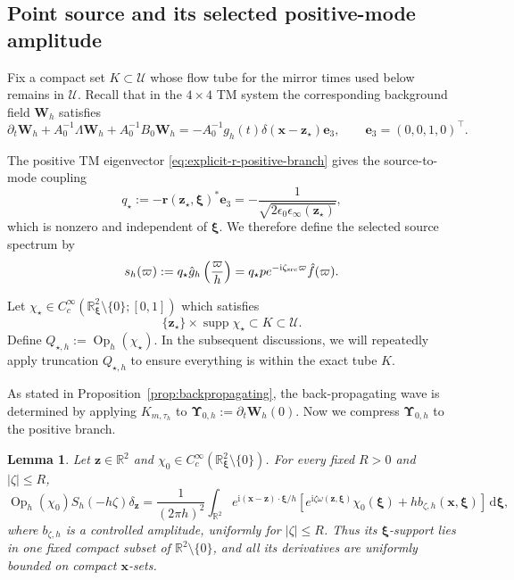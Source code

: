 \documentclass[11pt,reqno]{amsart}
\newtheorem{lemma}{Lemma}[section]
\newcommand{\ii}{\mathrm{i}}
\newcommand{\dd}{\,\mathrm{d}}
\newcommand{\Op}{\operatorname{Op}}
\newcommand{\supp}{\operatorname{supp}}
\numberwithin{equation}{section}
\begin{document}
\subsection{Point source and its selected positive-mode amplitude}

Fix a compact set $K\subset\mathcal U$ whose flow tube for the mirror times used below remains in $\mathcal U$. Recall that in the $4\times4$ TM system the corresponding background field $\bm{W}_h$ satisfies
\begin{equation*}
    \partial_t\bm{W}_h+A_0^{-1}\Lambda\bm{W}_h+A_0^{-1}B_0\bm{W}_h = -A_0^{-1}g_h(t)\delta(\bm{x}-\bm{z}_\star)\bm{e}_3, \qquad \bm{e}_3=(0,0,1,0)^\top.
\end{equation*}

The positive TM eigenvector \eqref{eq:explicit-r-positive-branch} gives the source-to-mode coupling
$$
    q_\star:=-\bm{r}(\bm{z}_\star,\bm{\xi})^*\bm{e}_3=-\frac{1}{\sqrt{2\epsilon_0\epsilon_\infty(\bm{z}_\star)}},
$$
which is nonzero and independent of $\bm{\xi}$. We therefore define the selected source spectrum by
\begin{equation}\label{eq:source-spectrum}
    s_h(\varpi):= q_\star\hat{g}_h\left(\frac{\varpi}{h}\right) = q_\star pe^{-\ii \zeta_{\rm src}\varpi}\hat{f}(\varpi).
\end{equation}

Let $\chi_\star\in C_c^\infty(\mathbb R_{\bm{\xi}}^2\setminus\{0\};[0,1])$ which satisfies
\begin{equation}\label{eq:source-cutoff}
    \{\bm{z}_\star\}\times\supp\chi_\star\subset K\subset\mathcal U.
\end{equation}
Define $Q_{\star,h}:=\Op_h(\chi_\star)$. In the subsequent discussions, we will repeatedly apply truncation $Q_{\star,h}$ to ensure everything is within the exact tube $K$. 

As stated in Proposition~\ref{prop:backpropagating}, the back-propagating wave is determined by applying $K_{m,\tau_h}$ to $\bm{\Upsilon}_{0,h}:=\partial_t\bm{W}_h(0)$. Now we compress $\bm{\Upsilon}_{0,h}$ to the positive branch. 

\begin{lemma}\label{lem:short-time-point-parametrix}
Let $\bm z\in\mathbb R^2$ and $\chi_0\in C_c^\infty(\mathbb R_{\bm\xi}^2\setminus\{0\})$. For every fixed $R>0$ and $|\zeta|\le R$,
\begin{equation}\label{eq:short-time-point-parametrix}
 \Op_h(\chi_0)S_h(-h\zeta)\delta_{\bm z}
 =\frac1{(2\pi h)^2}\int_{\mathbb R^2}e^{\ii(\bm x-\bm z)\cdot\bm\xi/h}
 \left[e^{\ii\zeta\omega(\bm z,\bm\xi)}\chi_0(\bm\xi)
 +h b_{\zeta,h}(\bm x,\bm\xi)\right]\dd\bm\xi,
\end{equation}
where $b_{\zeta,h}$ is a controlled amplitude, uniformly for $|\zeta|\le R$. Thus its $\bm\xi$-support lies in one fixed compact subset of $\mathbb R^2\setminus\{0\}$, and all its derivatives are uniformly bounded on compact $\bm x$-sets.
\end{lemma}
\end{document}
